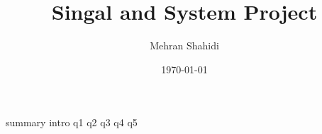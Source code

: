 \documentclass{article}
\title{Singal and System Project}
\author{Mehran Shahidi}
\date{\today}
\begin{document}
\maketitle
{}
{summary}
\newpage
\tableofcontents
\newpage
{}
{intro}
{q1}
{q2}
{q3}
{q4}
{q5}

\newpage
\end{document}

